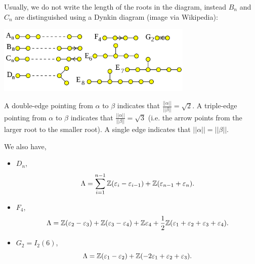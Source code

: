 Usually, we do not write the length of the roots in the diagram, instead
$B_n$ and $C_n$ are distinguished using a Dynkin diagram (image via Wikipedia):

\begin{center}
\includegraphics[width=0.7\textwidth]{img/dynkin.png}
\end{center}

A double-edge pointing from $\alpha$ to $\beta$ indicates that
$\frac{||\alpha||}{||\beta||} = \sqrt{2}$. A triple-edge pointing from
$\alpha$ to $\beta$ indicates that $\frac{||\alpha||}{||\beta||} = \sqrt{3}$
(i.e. the arrow points from the larger root to the smaller root).
A single edge indicates that $||\alpha|| = ||\beta||$.

\newpage

We also have,
\begin{itemize}
\item $D_n$,
\[
    \Lambda = \sum_{i=1}^{n-1} \mathbb{Z} (\varepsilon_i - \varepsilon_{i-1})
    + \mathbb{Z}(\varepsilon_{n-1} + \varepsilon_{n}).
\]
\item $F_4$,
\[
    \Lambda = \mathbb{Z} (\varepsilon_2 - \varepsilon_3)
    + \mathbb{Z}(\varepsilon_3 - \varepsilon_4)
    + \mathbb{Z}\varepsilon_4
    + \frac{1}{2} \mathbb{Z} (\varepsilon_1 + \varepsilon_2 + \varepsilon_3 + \varepsilon_4).
\]
\item $G_2 = I_2(6)$,
\[
    \Lambda = \mathbb{Z} (\varepsilon_1 - \varepsilon_2)
    + \mathbb{Z} (-2 \varepsilon_1 + \varepsilon_2 + \varepsilon_3).
\]
\end{itemize}
